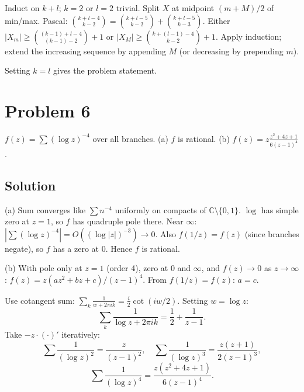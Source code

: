 \documentclass{article}
\begin{document}
Induct on $k + l$; $k = 2$ or $l = 2$ trivial. Split $X$ at midpoint $(m + M)/2$ of min/max. Pascal: $\binom{k+l-4}{k-2} = \binom{k+l-5}{k-2} + \binom{k+l-5}{k-3}$. Either $|X_m| \ge \binom{(k-1) + l - 4}{(k-1) - 2} + 1$ or $|X_M| \ge \binom{k + (l-1) - 4}{k-2} + 1$. Apply induction; extend the increasing sequence by appending $M$ (or decreasing by prepending $m$).

Setting $k = l$ gives the problem statement.

\section*{Problem 6}
$f(z) = \sum (\log z)^{-4}$ over all branches. (a) $f$ is rational. (b) $f(z) = z \tfrac{z^2 + 4z + 1}{6(z - 1)^4}$.

\subsection*{Solution}
(a) Sum converges like $\sum n^{-4}$ uniformly on compacts of $\mathbb{C} \setminus \{0, 1\}$. $\log$ has simple zero at $z = 1$, so $f$ has quadruple pole there. Near $\infty$: $|\sum (\log z)^{-4}| = O((\log|z|)^{-3}) \to 0$. Also $f(1/z) = f(z)$ (since branches negate), so $f$ has a zero at $0$. Hence $f$ is rational.

(b) With pole only at $z = 1$ (order 4), zero at $0$ and $\infty$, and $f(z) \to 0$ as $z \to \infty$: $f(z) = z(a z^2 + b z + c)/(z-1)^4$. From $f(1/z) = f(z)$: $a = c$.

Use cotangent sum: $\sum_k \tfrac{1}{w + 2\pi i k} = \tfrac{i}{2} \cot(iw/2)$. Setting $w = \log z$:
\[
\sum_k \frac{1}{\log z + 2\pi i k} = \frac{1}{2} + \frac{1}{z - 1}.
\]
Take $-z \cdot (\cdot)'$ iteratively:
\[
\sum \frac{1}{(\log z)^2} = \frac{z}{(z-1)^2}, \quad \sum \frac{1}{(\log z)^3} = \frac{z(z+1)}{2(z-1)^3},
\]
\[
\sum \frac{1}{(\log z)^4} = \frac{z(z^2 + 4z + 1)}{6(z-1)^4}.
\]
\end{document}
